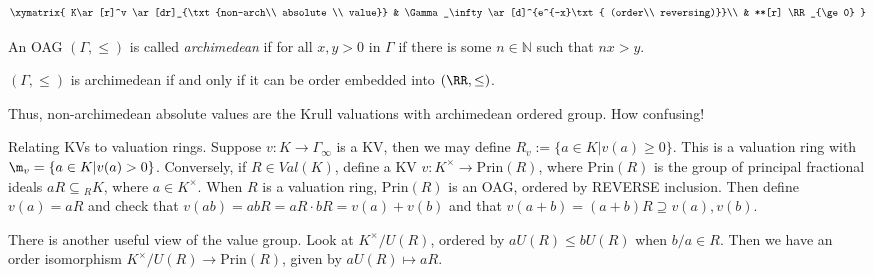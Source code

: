  \[\xymatrix{
 K\ar[r]^v \ar[dr]_{\txt{non-arch\\ absolute \\ value}} & \Gamma_\infty \ar[d]^{e^{-x}\txt{ (order\\ reversing)}}\\
  & **[r] \RR_{\ge 0}
 }\]

 An OAG $(\Gamma,\le)$ is called \emph{archimedean} if for all $x,y>0$ in
 $\Gamma$ if there is some $n\in \mathbb{N}$ such that $nx>y$.

 \begin{theorem}[H\"older, 1901]
   $(\Gamma,\le)$ is archimedean if and only if it can be order embedded into
   $(\RR,\le)$.
 \end{theorem}
 Thus, non-archimedean absolute values are the Krull valuations with archimedean ordered
 group. How confusing!

 Relating KVs to valuation rings. Suppose $v:K\to \Gamma_\infty$ is a KV, then we may
 define $R_v:=\{a\in K| v(a)\ge 0\}$. This is a valuation ring with $\m_v=\{a\in
 K|v(a)>0\}$. Conversely, if $R\in Val(K)$, define a KV $v:K^\times \to \text{Prin}(R)$,
 where $\text{Prin}(R)$ is the group of principal fractional ideals $aR\subseteq {}_R K$,
 where $a\in K^\times$. When $R$ is a valuation ring, $\text{Prin}(R)$ is an OAG, ordered
 by REVERSE inclusion. Then define $v(a)=aR$ and check that $v(ab)=abR=aR\cdot
 bR=v(a)+v(b)$ and that $v(a+b)=(a+b)R \supseteq v(a), v(b)$.

 There is another useful view of the value group. Look at $K^\times /U(R)$, ordered by
 $aU(R)\le bU(R)$ when $b/a\in R$. Then we have an order isomorphism $K^\times/U(R)\to
 \text{Prin}(R)$, given by $aU(R)\mapsto aR$.

